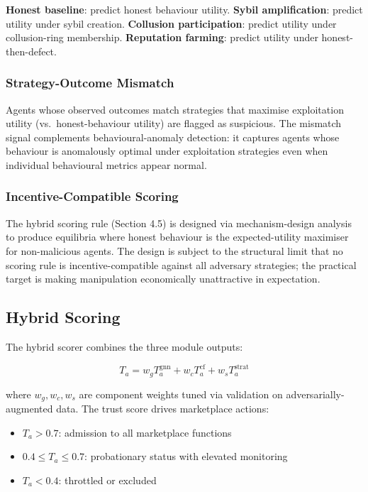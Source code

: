 \documentclass[sigconf,nonacm]{acmart}
\begin{document}
\textbf{Honest baseline}: predict honest behaviour utility.
\textbf{Sybil amplification}: predict utility under sybil creation.
\textbf{Collusion participation}: predict utility under collusion-ring
membership.
\textbf{Reputation farming}: predict utility under
honest-then-defect.

\subsubsection{Strategy-Outcome Mismatch}

Agents whose observed outcomes match strategies that maximise
exploitation utility (vs.\ honest-behaviour utility) are flagged as
suspicious. The mismatch signal complements behavioural-anomaly
detection: it captures agents whose behaviour is anomalously
optimal under exploitation strategies even when individual
behavioural metrics appear normal.

\subsubsection{Incentive-Compatible Scoring}

The hybrid scoring rule (Section 4.5) is designed via mechanism-design
analysis to produce equilibria where honest behaviour is the
expected-utility maximiser for non-malicious agents. The design
is subject to the structural limit that no scoring rule is
incentive-compatible against all adversary strategies; the practical
target is making manipulation economically unattractive in
expectation.

\subsection{Hybrid Scoring}

The hybrid scorer combines the three module outputs:

\begin{equation}
  T_a = w_g T_a^{\text{gnn}} + w_c T_a^{\text{cf}} + w_s T_a^{\text{strat}}
\end{equation}

where $w_g, w_c, w_s$ are component weights tuned via validation
on adversarially-augmented data. The trust score drives marketplace
actions:

\begin{itemize}
  \item $T_a > 0.7$: admission to all marketplace functions
  \item $0.4 \leq T_a \leq 0.7$: probationary status with
        elevated monitoring
  \item $T_a < 0.4$: throttled or excluded
\end{itemize}
\end{document}
